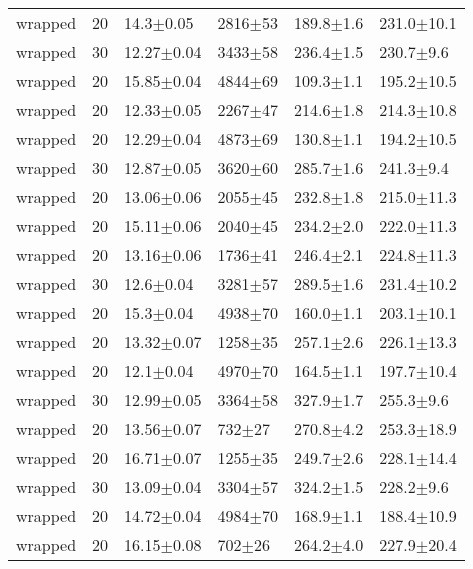 \begin{tabular}{lrllll}
      wrapped &      20 &    14.3$\pm$0.05 &  2816$\pm$53 &   189.8$\pm$1.6 &  231.0$\pm$10.1 \\
      wrapped &      30 &   12.27$\pm$0.04 &  3433$\pm$58 &   236.4$\pm$1.5 &   230.7$\pm$9.6 \\
      wrapped &      20 &   15.85$\pm$0.04 &  4844$\pm$69 &   109.3$\pm$1.1 &  195.2$\pm$10.5 \\
      wrapped &      20 &   12.33$\pm$0.05 &  2267$\pm$47 &   214.6$\pm$1.8 &  214.3$\pm$10.8 \\
      wrapped &      20 &   12.29$\pm$0.04 &  4873$\pm$69 &   130.8$\pm$1.1 &  194.2$\pm$10.5 \\
      wrapped &      30 &   12.87$\pm$0.05 &  3620$\pm$60 &   285.7$\pm$1.6 &   241.3$\pm$9.4 \\
      wrapped &      20 &   13.06$\pm$0.06 &  2055$\pm$45 &   232.8$\pm$1.8 &  215.0$\pm$11.3 \\
      wrapped &      20 &   15.11$\pm$0.06 &  2040$\pm$45 &   234.2$\pm$2.0 &  222.0$\pm$11.3 \\
      wrapped &      20 &   13.16$\pm$0.06 &  1736$\pm$41 &   246.4$\pm$2.1 &  224.8$\pm$11.3 \\
      wrapped &      30 &    12.6$\pm$0.04 &  3281$\pm$57 &   289.5$\pm$1.6 &  231.4$\pm$10.2 \\
      wrapped &      20 &    15.3$\pm$0.04 &  4938$\pm$70 &   160.0$\pm$1.1 &  203.1$\pm$10.1 \\
      wrapped &      20 &   13.32$\pm$0.07 &  1258$\pm$35 &   257.1$\pm$2.6 &  226.1$\pm$13.3 \\
      wrapped &      20 &    12.1$\pm$0.04 &  4970$\pm$70 &   164.5$\pm$1.1 &  197.7$\pm$10.4 \\
      wrapped &      30 &   12.99$\pm$0.05 &  3364$\pm$58 &   327.9$\pm$1.7 &   255.3$\pm$9.6 \\
      wrapped &      20 &   13.56$\pm$0.07 &   732$\pm$27 &   270.8$\pm$4.2 &  253.3$\pm$18.9 \\
      wrapped &      20 &   16.71$\pm$0.07 &  1255$\pm$35 &   249.7$\pm$2.6 &  228.1$\pm$14.4 \\
      wrapped &      30 &   13.09$\pm$0.04 &  3304$\pm$57 &   324.2$\pm$1.5 &   228.2$\pm$9.6 \\
      wrapped &      20 &   14.72$\pm$0.04 &  4984$\pm$70 &   168.9$\pm$1.1 &  188.4$\pm$10.9 \\
      wrapped &      20 &   16.15$\pm$0.08 &   702$\pm$26 &   264.2$\pm$4.0 &  227.9$\pm$20.4 \\

\end{tabular}
